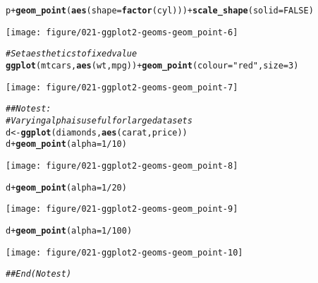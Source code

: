 \documentclass[a4paper,titlepage]{tufte-handout}\usepackage[]{graphicx}\usepackage[]{color}
\makeatletter
\def\maxwidth{ %
  \ifdim\Gin@nat@width>\linewidth
    \linewidth
  \else
    \Gin@nat@width
  \fi
}
\newcommand{\hlnum}[1]{\textcolor[rgb]{0.686,0.059,0.569}{#1}}%
\newcommand{\hlstr}[1]{\textcolor[rgb]{0.192,0.494,0.8}{#1}}%
\newcommand{\hlcom}[1]{\textcolor[rgb]{0.678,0.584,0.686}{\textit{#1}}}%
\newcommand{\hlopt}[1]{\textcolor[rgb]{0,0,0}{#1}}%
\newcommand{\hlstd}[1]{\textcolor[rgb]{0.345,0.345,0.345}{#1}}%
\newcommand{\hlkwb}[1]{\textcolor[rgb]{0.69,0.353,0.396}{#1}}%
\newcommand{\hlkwc}[1]{\textcolor[rgb]{0.333,0.667,0.333}{#1}}%
\newcommand{\hlkwd}[1]{\textcolor[rgb]{0.737,0.353,0.396}{\textbf{#1}}}%
\newenvironment{kframe}{%
 \def\at@end@of@kframe{}%
 \ifinner\ifhmode%
  \def\at@end@of@kframe{\end{minipage}}%
  \begin{minipage}{\columnwidth}%
 \fi\fi%
 \def\FrameCommand##1{\hskip\@totalleftmargin \hskip-\fboxsep
 \colorbox{shadecolor}{##1}\hskip-\fboxsep
     \hskip-\linewidth \hskip-\@totalleftmargin \hskip\columnwidth}%
 \MakeFramed {\advance\hsize-\width
   \@totalleftmargin\z@ \linewidth\hsize
   \@setminipage}}%
 {\par\unskip\endMakeFramed%
 \at@end@of@kframe}
\newenvironment{knitrout}{}{} %
\makeatother
\begin{document}
\begin{knitrout}
\begin{kframe}
\begin{alltt}
\hlstd{p} \hlopt{+} \hlkwd{geom_point}\hlstd{(}\hlkwd{aes}\hlstd{(}\hlkwc{shape} \hlstd{=} \hlkwd{factor}\hlstd{(cyl)))} \hlopt{+} \hlkwd{scale_shape}\hlstd{(}\hlkwc{solid} \hlstd{=} \hlnum{FALSE}\hlstd{)}
\end{alltt}
\end{kframe}
\texttt{[image: figure/021-ggplot2-geoms-geom\_point-6]} 
\begin{kframe}\begin{alltt}
\hlcom{# Set aesthetics to fixed value}
\hlkwd{ggplot}\hlstd{(mtcars,} \hlkwd{aes}\hlstd{(wt, mpg))} \hlopt{+} \hlkwd{geom_point}\hlstd{(}\hlkwc{colour} \hlstd{=} \hlstr{"red"}\hlstd{,} \hlkwc{size} \hlstd{=} \hlnum{3}\hlstd{)}
\end{alltt}
\end{kframe}
\texttt{[image: figure/021-ggplot2-geoms-geom\_point-7]} 
\begin{kframe}\begin{alltt}
\hlcom{## No test: }
\hlcom{# Varying alpha is useful for large datasets}
\hlstd{d} \hlkwb{<-} \hlkwd{ggplot}\hlstd{(diamonds,} \hlkwd{aes}\hlstd{(carat, price))}
\hlstd{d} \hlopt{+} \hlkwd{geom_point}\hlstd{(}\hlkwc{alpha} \hlstd{=} \hlnum{1}\hlopt{/}\hlnum{10}\hlstd{)}
\end{alltt}
\end{kframe}
\texttt{[image: figure/021-ggplot2-geoms-geom\_point-8]} 
\begin{kframe}\begin{alltt}
\hlstd{d} \hlopt{+} \hlkwd{geom_point}\hlstd{(}\hlkwc{alpha} \hlstd{=} \hlnum{1}\hlopt{/}\hlnum{20}\hlstd{)}
\end{alltt}
\end{kframe}
\texttt{[image: figure/021-ggplot2-geoms-geom\_point-9]} 
\begin{kframe}\begin{alltt}
\hlstd{d} \hlopt{+} \hlkwd{geom_point}\hlstd{(}\hlkwc{alpha} \hlstd{=} \hlnum{1}\hlopt{/}\hlnum{100}\hlstd{)}
\end{alltt}
\end{kframe}
\texttt{[image: figure/021-ggplot2-geoms-geom\_point-10]} 
\begin{kframe}\begin{alltt}
\hlcom{## End(No test)}


\end{alltt}
\end{kframe}
\end{knitrout}
\end{document}
